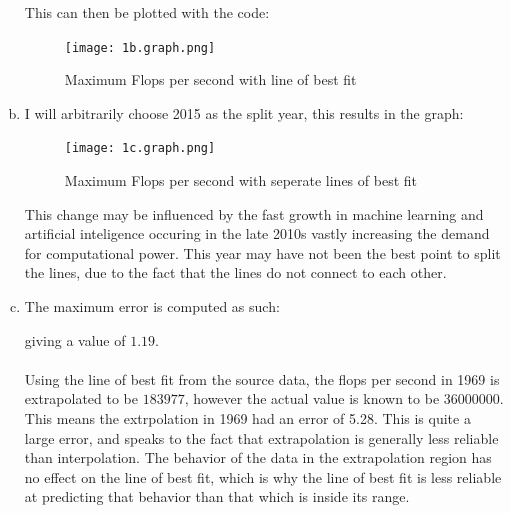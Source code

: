 \documentclass[11pt]{article}
\begin{document}
\begin{enumerate}[a)]
  This can then be plotted with the code:
  
  \begin{figure}[H]
    \centering
    \texttt{[image: 1b.graph.png]}
    \caption{Maximum Flops per second with line of best fit}
  \end{figure}
\item I will arbitrarily choose 2015 as the split year, this results in the graph:
  \begin{figure}[H]
    \centering
    \texttt{[image: 1c.graph.png]}
    \caption{Maximum Flops per second with seperate lines of best fit}
  \end{figure}
  This change may be influenced by the fast growth in machine learning and artificial inteligence occuring in the late 2010s vastly increasing the demand for computational power.
  This year may have not been the best point to split the lines, due to the fact that the lines do not connect to each other.
\item The maximum error is computed as such:
  
  giving a value of $1.19$.
  \\\\
  Using the line of best fit from the source data, the flops per second in 1969 is extrapolated to be $183977$, however the actual value is known to be $36000000$.
  This means the extrpolation in 1969 had an error of 5.28. This is quite a large error, and speaks to the fact that extrapolation is generally less reliable than interpolation.
  The behavior of the data in the extrapolation region has no effect on the line of best fit, which is why the line of best fit is less reliable at predicting that behavior than that which is inside its range.
\end{enumerate}

\pagebreak
\end{document}
